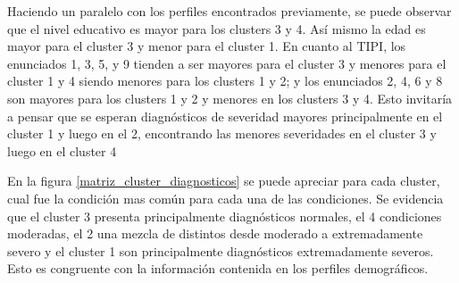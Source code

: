 \begin{table}[ht]
\centering
\caption{Perfil medio dentro de cada cluster}
\end{table}%

Haciendo un paralelo con los perfiles encontrados previamente, se puede observar que el nivel educativo es mayor para los clusters 3 y 4. Así mismo la edad es mayor para el cluster 3 y menor para el cluster 1.  En cuanto al TIPI, los enunciados 1, 3, 5, y 9 tienden a ser mayores para el cluster 3 y menores para el cluster 1 y 4 siendo menores para los clusters 1 y 2; y los enunciados 2, 4, 6 y 8 son mayores para los clusters 1 y 2 y menores en los clusters 3 y 4. Esto invitaría a pensar que se esperan diagnósticos de severidad mayores principalmente en el cluster 1 y luego en el 2, encontrando las menores severidades en el cluster 3 y luego en el cluster 4


\medbreak
 
En la figura \ref{matriz_cluster_diagnosticos} se puede apreciar para cada cluster, cual fue la condición mas común para cada una de las condiciones. Se evidencia que el cluster 3 presenta principalmente diagnósticos normales, el 4 condiciones moderadas, el 2 una mezcla de distintos desde moderado a extremadamente severo y el cluster 1 son principalmente diagnósticos extremadamente severos. Esto es congruente con la información contenida en los perfiles demográficos.
 
